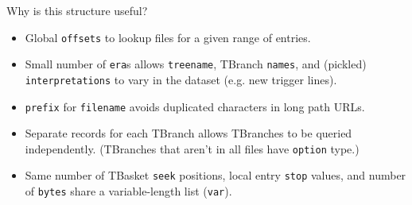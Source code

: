 \documentclass[aspectratio=169]{beamer}
\begin{document}
\begin{frame}{Why is this structure useful?}
\large
\vspace{0.5 cm}

\begin{itemize}\setlength{\itemsep}{0.5 cm}
\item Global \texttt{offsets} to lookup files for a given range of entries.
\item Small number of \texttt{era}s allows \texttt{treename}, TBranch \texttt{names}, and (pickled) \texttt{interpretations} to vary in the dataset (e.g. new trigger lines).
\item \texttt{prefix} for \texttt{filename} avoids duplicated characters in long path URLs.
\item Separate records for each TBranch allows TBranches to be queried independently. (TBranches that aren't in all files have \texttt{option} type.)
\item Same number of TBasket \texttt{seek} positions, local entry \texttt{stop} values, and number of \texttt{bytes} share a variable-length list (\texttt{var}).
\end{itemize}
\end{frame}
\end{document}
